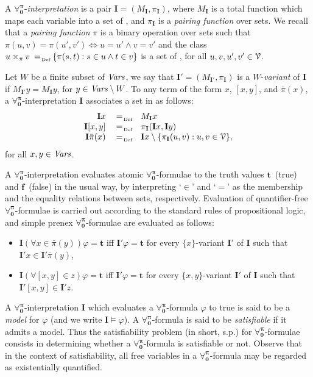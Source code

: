 \documentclass[a4paper,UKenglish]{lipics}
\newcommand{\Lang}{\ensuremath{\mathbf{\forall_{0}^{\pi}}}\xspace}
\newcommand{\nonpairs}[1]{\bar{\pi}(#1)}
\newcommand{\assignment}[1]{\ensuremath{M_{#1}}}
\newcommand{\pairf}[1]{\ensuremath{\pi_{#1}}}
\newcommand{\inter}{\ensuremath{\mathbf{I}}\xspace}
\newcommand{\mtrue}{\ensuremath{\mathbf{t}}}
\newcommand{\mfalse}{\ensuremath{\mathbf{f}}}
\begin{document}
A \Lang-\emph{interpretation} is a pair $\inter=(\assignment{\inter},
\pairf{\inter})$, where $\assignment{\inter}$ is a total function
which maps each variable into a set of \VNU, and $\pairf{\inter}$ is a
\emph{pairing function} over sets. We recall that a
\emph{pairing function} $\pi$ is a binary operation over sets such
that $\pi(u,v)=\pi(u',v') \iff u=u' \wedge v=v'$ and the class $u
\times_{\pi} v \defAs \{ \pi(s,t) : s \in u \wedge t \in v\}$ is a set
of \VNU, for all $u,v,u',v' \in \mathcal{V}$. 

Let $W$ be a finite subset of
$\mathit{Vars}$, we say that $\inter' = (\assignment{\inter'},
\pairf{\inter})$ is a $W$-\emph{variant} of $\inter$ if $M_{\inter'} y
= M_{\inter} y$, for $y \in \mathit{Vars} \setminus W$.  To any term of the
form $x$, $[x,y]$, and $\nonpairs{x}$, a \Lang-interpretation \inter
associates a set in \VNU as follows:
\[
\begin{array}{rcl}
 \inter x & \defAs & \assignment{\inter} x\\
 \inter [x,y] & \defAs & \pairf{\inter} (\inter x, \inter y)\\
 \inter \nonpairs{x} & \defAs &
 \inter x \setminus \{\pi_{\inter}(u,v) : u, v \in \VNU\},
\end{array}
\]
for all $x,y \in \mathit{Vars}$.

A \Lang-interpretation evaluates atomic \Lang-formulae to the truth
values \mtrue\ (true) and \mfalse\ (false) in the usual way, by
interpreting `$\in$' and `$=$' as the membership and the equality
relations between sets, respectively.
Evaluation of quantifier-free
\Lang-formulae is carried out according to the standard rules of
propositional logic, and simple prenex \Lang-formulae are evaluated as
follows:
\begin{itemize}
\item $\inter(\forall x \in \nonpairs{y})\varphi = \mtrue$ iff
$\inter' \varphi = \mtrue$ for every $\{x\}$-variant $\inter'$ of
$\inter$ such that $\inter' x \in \inter' \nonpairs{y}$,

\item $\inter(\forall [x,y] \in z)\varphi = \mtrue$ iff $\inter'
\varphi = \mtrue$ for every $\{x,y\}$-variant $\inter'$ of $\inter$
such that $\inter' [x,y] \in \inter' z$.
\end{itemize}

A \Lang-interpretation \inter which evaluates a \Lang-formula
$\varphi$ to true is said to be a \emph{model} for $\varphi$ (and we
write $\inter \models \varphi$).  A \Lang-formula is said to be
\emph{satisfiable} if it admits a model.  Thus the satisfiability
problem (in short, s.p.) for \Lang-formulae consists in determining
whether a \Lang-formula is satisfiable or not.
%
Observe that in the context of satisfiability, all free variables in a
\Lang-formula may be regarded as existentially quantified.
\end{document}
